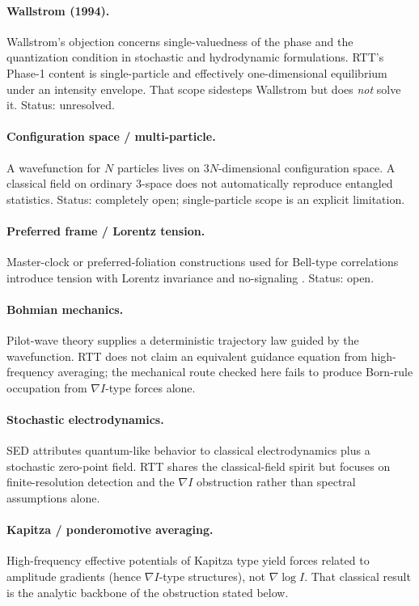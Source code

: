 \documentclass[11pt]{article}
\begin{document}
\paragraph{Wallstrom (1994).}
Wallstrom's objection \cite{wallstrom} concerns single-valuedness of the phase and the quantization condition in stochastic and hydrodynamic formulations.
RTT's Phase-1 content is single-particle and effectively one-dimensional equilibrium under an intensity envelope.
That scope sidesteps Wallstrom but does \emph{not} solve it. Status: unresolved.

\paragraph{Configuration space / multi-particle.}
A wavefunction for $N$ particles lives on $3N$-dimensional configuration space.
A classical field on ordinary 3-space does not automatically reproduce entangled statistics.
Status: completely open; single-particle scope is an explicit limitation.

\paragraph{Preferred frame / Lorentz tension.}
Master-clock or preferred-foliation constructions used for Bell-type correlations introduce tension with Lorentz invariance and no-signaling \cite{valentini}.
Status: open.

\paragraph{Bohmian mechanics.}
Pilot-wave theory \cite{bohm52} supplies a deterministic trajectory law guided by the wavefunction.
RTT does not claim an equivalent guidance equation from high-frequency averaging; the mechanical route checked here fails to produce Born-rule occupation from $\nabla I$-type forces alone.

\paragraph{Stochastic electrodynamics.}
SED \cite{delapena,boyer} attributes quantum-like behavior to classical electrodynamics plus a stochastic zero-point field.
RTT shares the classical-field spirit but focuses on finite-resolution detection and the $\nabla I$ obstruction rather than spectral assumptions alone.

\paragraph{Kapitza / ponderomotive averaging.}
High-frequency effective potentials of Kapitza type \cite{kapitza} yield forces related to amplitude gradients (hence $\nabla I$-type structures), not $\nabla\log I$.
That classical result is the analytic backbone of the obstruction stated below.
\end{document}
